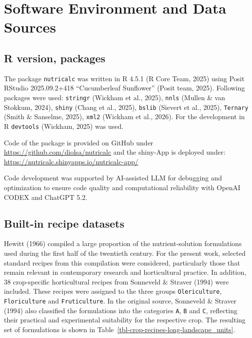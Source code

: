 \documentclass[
  letterpaper,
  DIV=11,
  numbers=noendperiod]{scrreprt}
\begin{document}
\section{Software Environment and Data
Sources}\label{software-environment-and-data-sources}

\subsection{R version, packages}\label{r-version-packages}

The package \texttt{nutricalc} was written in R 4.5.1 (R Core Team,
2025) using Posit RStudio 2025.09.2+418 ``Cucumberleaf Sunflower''
(Posit team, 2025). Following packages were used: \texttt{stringr}
(Wickham et al., 2025), \texttt{nnls} (Mullen \& van Stokkum, 2024),
\texttt{shiny} (Chang et al., 2025), \texttt{bslib} (Sievert et al.,
2025), \texttt{Ternary} (Smith \& Sanselme, 2025), \texttt{xml2}
(Wickham et al., 2026). For the development in R \texttt{devtools}
(Wickham, 2025) was used.

Code of the package is provided on GitHub under
\url{https://github.com/diolsa/nutricalc} and the shiny-App is deployed
under: \url{https://nutricalc.shinyapps.io/nutricalc-app/}

Code development was supported by AI-assisted LLM for debugging and
optimization to ensure code quality and computational reliability with
OpenAI CODEX and ChatGPT 5.2.

\subsection{Built-in recipe datasets}\label{built-in-recipe-datasets}

Hewitt (1966) compiled a large proportion of the nutrient-solution
formulations used during the first half of the twentieth century. For
the present work, selected standard recipes from this compilation were
considered, particularly those that remain relevant in contemporary
research and horticultural practice. In addition, 38 crop-specific
horticultural recipes from Sonneveld \& Straver (1994) were included.
These recipes were assigned to the three groups \texttt{Olericulture},
\texttt{Floriculture} and \texttt{Fruticulture}. In the original source,
Sonneveld \& Straver (1994) also classified the formulations into the
categories \texttt{A}, \texttt{B} and \texttt{C}, reflecting their
practical and experimental suitability for the respective crop. The
resulting set of formulations is shown in
Table~\ref{tbl-crop-recipes-long-landscape_units}.
\end{document}
